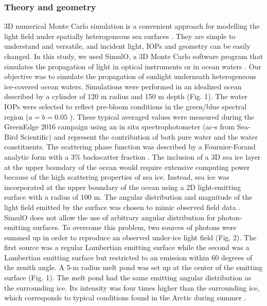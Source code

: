 \subsubsection{Theory and geometry}

3D numerical Monte Carlo simulation is a convenient approach for modelling the light field under spatially heterogeneous sea surfaces \citep{Mobley_ocean_optics_book, Petrich2012, Katlein2014, Katlein2016}. They are simple to understand and versatile, and incident light, IOPs and geometry can be easily changed. In this study, we used SimulO, a 3D Monte Carlo software program that simulates the propagation of light in optical instruments or in ocean waters \citep{Leymarie2010}. Our objective was to simulate the propagation of sunlight underneath heterogeneous ice-covered ocean waters. Simulations were performed in an idealized ocean described by a cylinder of 120 m radius and 150 m depth (Fig. 1). The water IOPs were selected to reflect pre-bloom conditions in the green/blue spectral region ($a = b = 0.05$ \mminus{}). These typical averaged values were measured during the GreenEdge 2016 campaign using an in situ spectrophotometer (ac-s from Sea-Bird Scientific) and represent the contribution of both pure water and the water constituents. The scattering phase function was described by a Fournier-Forand analytic form with a 3\% backscatter fraction \citep{Fournier1994, Mobley2002}. The inclusion of a 3D sea ice layer at the upper boundary of the ocean would require extensive computing power because of the high scattering properties of sea ice. Instead, sea ice was incorporated at the upper boundary of the ocean using a 2D light-emitting surface with a radius of 100 m. The angular distribution and magnitude of the light field emitted by the surface was chosen to mimic observed field data \citep{Girard2018}. SimulO does not allow the use of arbitrary angular distribution for photon-emitting surfaces. To overcome this problem, two sources of photons were summed up in order to reproduce an observed under-ice light field (Fig. 2). The first source was a regular Lambertian emitting surface while the second was a Lambertian emitting surface but restricted to an emission within 60 degrees of the zenith angle. A 5-m radius melt pond was set up at the center of the emitting surface (Fig. 1). The melt pond had the same emitting angular distribution as the surrounding ice. Its intensity was four times higher than the surrounding ice, which corresponds to typical conditions found in the Arctic during summer \citep{Perovich2016}.

